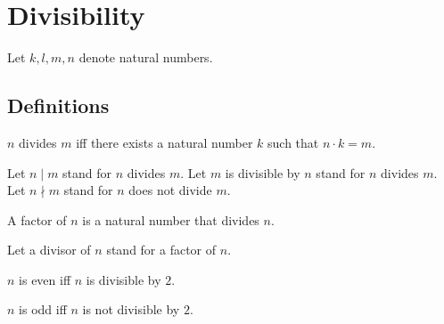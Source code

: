 \documentclass[../../natural-numbers.ftl.tex]{subfiles}
\begin{document}
  \section{Divisibility}

  \begin{forthel}
  \end{forthel}

  \begin{forthel}
  \end{forthel}

  \begin{forthel}
  \end{forthel}

  \begin{forthel}
    Let $k, l, m, n$ denote natural numbers.
  \end{forthel}


  \subsection{Definitions}

  \begin{forthel}
    \begin{definition}
      $n$ divides $m$ iff there exists a natural number $k$ such that $n \cdot k = m$.
    \end{definition}

    Let $n \mid m$ stand for $n$ divides $m$.
    Let $m$ is divisible by $n$ stand for $n$ divides $m$.
    Let $n \nmid m$ stand for $n$ does not divide $m$.

    \begin{definition}
      A factor of $n$ is a natural number that divides $n$.
    \end{definition}

    Let a divisor of $n$ stand for a factor of $n$.

    \begin{definition}
      $n$ is even iff $n$ is divisible by $2$.
    \end{definition}

    \begin{definition}
      $n$ is odd iff $n$ is not divisible by $2$.
    \end{definition}
  \end{forthel}
\end{document}

